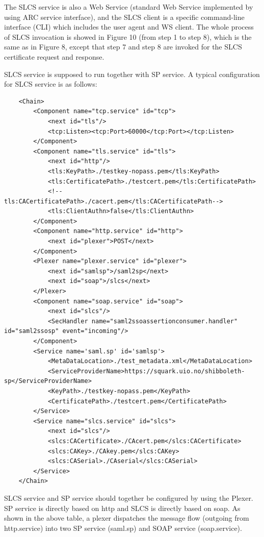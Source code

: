 \documentclass{article}                            %
\begin{document}
    The SLCS service is also a Web Service (standard Web Service implemented by using ARC service interface), and the SLCS client is a specific command-line interface (CLI) which includes the user agent and WS client. The whole process of SLCS invocation is showed in Figure 10 (from step 1 to step 8), which is the same as in Figure 8, except that step 7 and step 8 are invoked for the SLCS certificate request and response.


 SLCS service is supposed to run together with SP service. A typical configuration for SLCS service is as follows:

\begin{verbatim}
    <Chain>
        <Component name="tcp.service" id="tcp">
            <next id="tls"/>
            <tcp:Listen><tcp:Port>60000</tcp:Port></tcp:Listen>
        </Component>
        <Component name="tls.service" id="tls">
            <next id="http"/>
            <tls:KeyPath>./testkey-nopass.pem</tls:KeyPath>
            <tls:CertificatePath>./testcert.pem</tls:CertificatePath>
            <!--tls:CACertificatePath>./cacert.pem</tls:CACertificatePath-->
            <tls:ClientAuthn>false</tls:ClientAuthn>
        </Component>
        <Component name="http.service" id="http">
            <next id="plexer">POST</next>
        </Component>
        <Plexer name="plexer.service" id="plexer">
            <next id="samlsp">/saml2sp</next>
            <next id="soap">/slcs</next>
        </Plexer>
        <Component name="soap.service" id="soap">
            <next id="slcs"/>
            <SecHandler name="saml2ssoassertionconsumer.handler" id="saml2ssosp" event="incoming"/>
        </Component>
        <Service name='saml.sp' id='samlsp'>
            <MetaDataLocation>./test_metadata.xml</MetaDataLocation>
            <ServiceProviderName>https://squark.uio.no/shibboleth-sp</ServiceProviderName>
            <KeyPath>./testkey-nopass.pem</KeyPath>
            <CertificatePath>./testcert.pem</CertificatePath>
        </Service>
        <Service name="slcs.service" id="slcs">
            <next id="slcs"/>
            <slcs:CACertificate>./CAcert.pem</slcs:CACertificate>
            <slcs:CAKey>./CAkey.pem</slcs:CAKey>
            <slcs:CASerial>./CAserial</slcs:CASerial>
        </Service>
    </Chain>
\end{verbatim}

    SLCS service and SP service should together be configured by using the Plexer. SP service is directly based on http and SLCS is directly based on soap. As shown in the above table, a plexer dispatches the message flow (outgoing from http.service) into two SP service (saml.sp) and SOAP service (soap.service).
\end{document}
